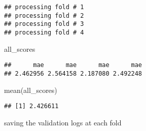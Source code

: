 \documentclass[
]{article}
\newenvironment{Shaded}{\begin{snugshade}}{\end{snugshade}}
\newcommand{\FunctionTok}[1]{\textcolor[rgb]{0.00,0.00,0.00}{#1}}
\newcommand{\NormalTok}[1]{#1}
\begin{document}
\begin{verbatim}
## processing fold # 1 
## processing fold # 2 
## processing fold # 3 
## processing fold # 4
\end{verbatim}

\begin{Shaded}
\begin{Highlighting}[]
\NormalTok{all\_scores}
\end{Highlighting}
\end{Shaded}

\begin{verbatim}
##      mae      mae      mae      mae 
## 2.462956 2.564158 2.187080 2.492248
\end{verbatim}

\begin{Shaded}
\begin{Highlighting}[]
\FunctionTok{mean}\NormalTok{(all\_scores)}
\end{Highlighting}
\end{Shaded}

\begin{verbatim}
## [1] 2.426611
\end{verbatim}

saving the validation logs at each fold
\end{document}
